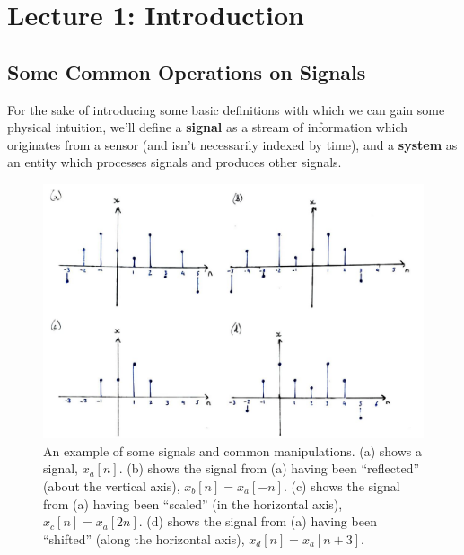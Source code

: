 \section{Lecture 1: Introduction}

\subsection{Some Common Operations on Signals}
%
For the sake of introducing some basic definitions with which we can gain some
physical intuition, we'll define a \textbf{signal} as a stream of information
which originates from a sensor (and isn't necessarily indexed by time), and a
\textbf{system} as an entity which processes signals and produces other signals.
%
\begin{figure}[!htb]
  \includegraphics[width=\textwidth]{images/lecture_1_signal_operations.JPG}
  \caption{
    An example of some signals and common manipulations. (a) shows a
    signal, $x_a[n]$. (b) shows the signal from (a) having been ``reflected''
    (about the vertical axis), $x_b[n] = x_a[-n]$. (c) shows the signal from (a)
    having been ``scaled'' (in the horizontal axis), $x_c[n] = x_a[2n]$. (d) shows
    the signal from (a) having been ``shifted'' (along the horizontal axis),
    $x_d[n] = x_a[n+3]$.
  }
  \label{fig::lecture_1_signal_operations}
\end{figure}


